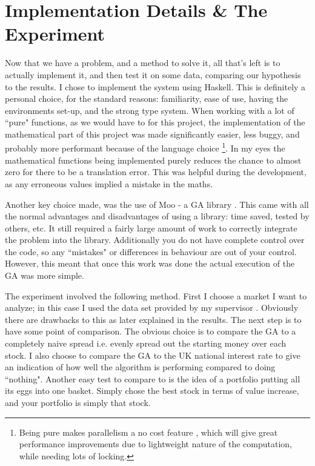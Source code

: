 \documentclass[11pt]{article}
\begin{document}
\section{Implementation Details \& The Experiment}

    Now that we have a problem, and a method to solve it, all that's left is to actually
    implement it, and then test it on some data, comparing our hypothesis to the results.
    I chose to implement the system using Haskell. This is definitely a personal
    choice, for the standard reasons: familiarity, ease of use, having the environments
    set-up, and the strong type system. When working with a lot of ``pure"
    functions, as we would have to for this project, the implementation 
    of the mathematical part of this project was made significantly
    easier, less buggy, and probably more performant because of the language choice
    \footnote{Being pure makes parallelism a no cost feature \cite{HarrisMarlowJones, Chakravarty},
    which will give great performance improvements due to lightweight nature of the 
    computation, while needing lots of locking. }.
    In my eyes the mathematical functions
    being implemented purely reduces the chance to almost zero for there to be a translation
    error. This was helpful during the development, as any erroneous values implied a mistake
    in the maths.

    Another key choice made, was the use of Moo - a GA library \cite{Moo}. This came with all
    the normal advantages and disadvantages of using a library: time saved, tested by others, etc.
    It still required a fairly large amount of work to correctly integrate the
    problem into the library. Additionally you do not have complete control over the code,
    so any ``mistakes" or differences in behaviour are out of your control. However,
    this meant that once this work was done the actual execution of the GA was more simple.

    The experiment involved the following method. First I choose a market I want to
    analyze; in this case I used the data set provided by my supervisor \cite{Dataset}.
    Obviously there are drawbacks to this as later explained in the results. The next step is
    to have some point of comparison. The obvious choice is to compare the GA to
    a completely naive spread i.e. evenly spread out the starting money over each stock.
    I also choose to compare the GA to the UK national interest rate \cite{BankOfE} to give an
    indication of how well the algorithm is performing compared to doing ``nothing". Another
    easy test to compare to is the idea of a portfolio putting all its eggs into one basket.
    Simply chose the best stock in terms of value increase, and your portfolio is simply that
    stock.
\end{document}
